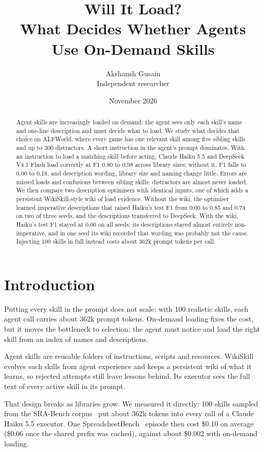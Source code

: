 \documentclass[11pt]{article}
\title{Will It Load?\\ What Decides Whether Agents Use On-Demand Skills}
\author{Akshansh Gusain\\Independent researcher}
\date{November 2026}
\begin{document}
\maketitle

\begin{abstract}
Agent skills are increasingly loaded on demand: the agent sees only each skill's name and one-line description and must decide what to load. We study what decides that choice on ALFWorld, where every game has one relevant skill among five sibling skills and up to 300 distractors. A short instruction in the agent's prompt dominates. With an instruction to load a matching skill before acting, Claude Haiku 5.5 and DeepSeek V4.1 Flash load correctly at F1 0.80 to 0.98 across library sizes; without it, F1 falls to 0.00 to 0.18, and description wording, library size and naming change little. Errors are missed loads and confusions between sibling skills; distractors are almost never loaded. We then compare two description optimisers with identical inputs, one of which adds a persistent WikiSkill-style wiki of load evidence. Without the wiki, the optimiser learned imperative descriptions that raised Haiku's test F1 from 0.00 to 0.85 and 0.74 on two of three seeds, and the descriptions transferred to DeepSeek. With the wiki, Haiku's test F1 stayed at 0.00 on all seeds; its descriptions stayed almost entirely non-imperative, and in one seed its wiki recorded that wording was probably not the cause. Injecting 100 skills in full instead costs about 362k prompt tokens per call.
\end{abstract}

\section{Introduction}
\label{sec:intro}

Putting every skill in the prompt does not scale: with 100 realistic skills, each agent call carries about 362k prompt tokens. On-demand loading fixes the cost, but it moves the bottleneck to selection: the agent must notice and load the right skill from an index of names and descriptions.

Agent skills are reusable folders of instructions, scripts and resources. WikiSkill~\cite{tang2026wikiskill} evolves such skills from agent experience and keeps a persistent wiki of what it learns, so rejected attempts still leave lessons behind. Its executor sees the full text of every active skill in its prompt.

That design breaks as libraries grow. We measured it directly: 100 skills sampled from the SRA-Bench corpus~\cite{su2026sra} put about 362k tokens into every call of a Claude Haiku 5.5 executor. One SpreadsheetBench~\cite{ma2024spreadsheetbench} episode then cost \$0.10 on average (\$0.06 once the shared prefix was cached), against about \$0.002 with on-demand loading.
\end{document}
